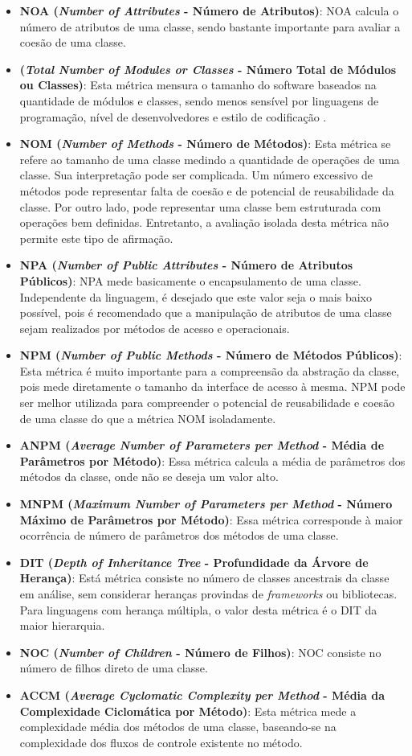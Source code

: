 \begin{itemize}
\item \textbf{NOA (\emph{Number of Attributes} - Número de Atributos)}: NOA calcula o número de atributos de uma classe, sendo bastante importante para avaliar a coesão de uma classe.
\item \textbf{(\emph{Total Number of Modules or Classes} - Número Total de Módulos ou Classes)}: Esta métrica mensura o tamanho do software baseados na quantidade de módulos e classes, sendo menos sensível por linguagens de programação, nível de desenvolvedores e estilo de codificação \cite{meirelles2013metrics}.
\item \textbf{NOM (\emph{Number of Methods} - Número de Métodos)}: Esta métrica se refere ao tamanho de uma classe medindo a quantidade de operações de uma classe. Sua interpretação pode ser complicada. Um número excessivo de métodos pode representar falta de coesão e de potencial de reusabilidade da classe. Por outro lado, pode representar uma classe bem estruturada com operações bem definidas. Entretanto, a avaliação isolada desta métrica não permite este tipo de afirmação.
\item \textbf{NPA (\emph{Number of Public Attributes} - Número de Atributos Públicos)}: NPA mede basicamente o encapsulamento de uma classe. Independente da linguagem, é desejado que este valor seja o mais baixo possível, pois é recomendado que a manipulação de atributos de uma classe sejam realizados por métodos de acesso e operacionais.
\item \textbf{NPM (\emph{Number of Public Methods} - Número de Métodos Públicos)}: Esta métrica é muito importante para a compreensão da abstração da classe, pois mede diretamente o tamanho da interface de acesso à mesma. NPM pode ser melhor utilizada para compreender o potencial de reusabilidade e coesão de uma classe do que a métrica NOM isoladamente.
\item \textbf{ANPM (\emph{Average Number of Parameters per Method} - Média de Parâmetros por Método)}: Essa métrica calcula a média de parâmetros dos métodos da classe, onde não se deseja um valor alto.
\item \textbf{MNPM (\emph{Maximum Number of Parameters per Method} - Número Máximo de Parâmetros por Método)}: Essa métrica corresponde à maior ocorrência de número de parâmetros dos métodos de uma classe.
\item \textbf{DIT (\emph{Depth of Inheritance Tree} - Profundidade da Árvore de Herança)}: Está métrica consiste no número de classes ancestrais da classe em análise, sem considerar heranças provindas de \emph{frameworks} ou bibliotecas. Para linguagens com herança múltipla, o valor desta métrica é o DIT da maior hierarquia.
\item \textbf{NOC (\emph{Number of Children} - Número de Filhos)}: NOC consiste no número de filhos direto de uma classe.
\item \textbf{ACCM (\emph{Average Cyclomatic Complexity per Method} - Média da Complexidade Ciclomática por Método)}: Esta métrica mede a complexidade média dos métodos de uma classe, baseando-se na complexidade dos fluxos de controle existente no método.
\end{itemize}

